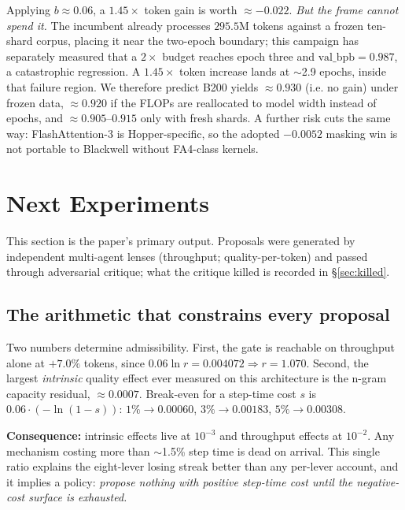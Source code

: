 \documentclass{article}
\newcommand{\valbpb}{\mathrm{val\_bpb}}
\begin{document}
Applying $b \approx 0.06$, a $1.45\times$ token gain is worth $\approx -0.022$. \emph{But the frame cannot spend it.} The incumbent already processes $295.5$M tokens against a frozen ten-shard corpus, placing it near the two-epoch boundary; this campaign has separately measured that a $2\times$ budget reaches epoch three and $\valbpb = 0.987$, a catastrophic regression. A $1.45\times$ token increase lands at $\sim$2.9 epochs, inside that failure region. We therefore predict B200 yields $\approx 0.930$ (i.e. no gain) under frozen data, $\approx 0.920$ if the FLOPs are reallocated to model width instead of epochs, and $\approx 0.905$--$0.915$ only with fresh shards. A further risk cuts the same way: FlashAttention-3 is Hopper-specific, so the adopted $-0.0052$ masking win is not portable to Blackwell without FA4-class kernels.

\section{Next Experiments}
This section is the paper's primary output. Proposals were generated by independent
multi-agent lenses (throughput; quality-per-token) and passed through adversarial critique;
what the critique killed is recorded in \S\ref{sec:killed}.

\subsection{The arithmetic that constrains every proposal}
Two numbers determine admissibility. First, the gate is reachable on throughput alone at
$\mathbf{+7.0\%}$ tokens, since $0.06\ln r = 0.004072 \Rightarrow r = 1.070$. Second, the
largest \emph{intrinsic} quality effect ever measured on this architecture is the n-gram
capacity residual, $\approx 0.0007$. Break-even for a step-time cost $s$ is
$0.06\cdot(-\ln(1-s))$: $1\% \to 0.00060$, $3\% \to 0.00183$, $5\% \to 0.00308$.

\textbf{Consequence:} intrinsic effects live at $10^{-3}$ and throughput effects at
$10^{-2}$. Any mechanism costing more than $\sim$1.5\% step time is dead on arrival. This
single ratio explains the eight-lever losing streak better than any per-lever account, and
it implies a policy: \emph{propose nothing with positive step-time cost until the
negative-cost surface is exhausted.}
\end{document}
